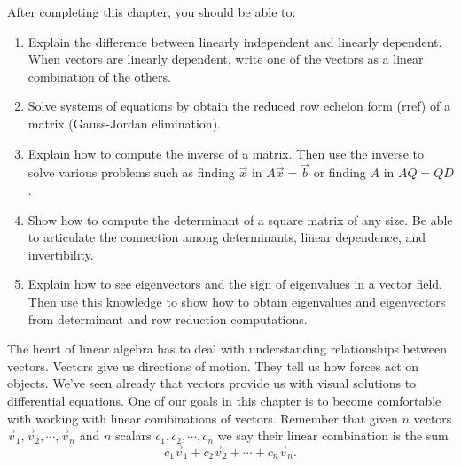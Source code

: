 \newcommand{\urlrref}{http://bmw.byuimath.com/dokuwiki/doku.php?id=rref\_calculator}



After completing this chapter, you should be able to:

\begin{enumerate}
\item Explain the difference between linearly independent and linearly dependent. When vectors are linearly dependent, write one of the vectors as a linear combination of the others. 
\item Solve systems of equations by obtain the reduced row echelon form (rref) of a matrix (Gauss-Jordan elimination).
\item Explain how to compute the inverse of a matrix. Then use the inverse to solve various problems such as finding $\vec x$ in $A\vec x = \vec b$ or finding $A$ in $AQ=QD$. 
\item Show how to compute the determinant of a square matrix of any size. Be able to articulate the connection among determinants, linear dependence, and invertibility. 
\item Explain how to see eigenvectors and the sign of eigenvalues in a vector field. Then use this knowledge to show how to obtain eigenvalues and eigenvectors from determinant and row reduction computations. 
\end{enumerate}


\newcommand{\ideagau}{Solving Systems of Equations}
\newcommand{\ideaind}{Linear Independence and Dependence}
\newcommand{\ideamul}{Matrix Multiplication and Inverses}
\newcommand{\ideadet}{Applications of Determinants}
\newcommand{\ideaeig}{Seeing Eigenvectors in Vector Fields}



\mysubsection{\ideaind}

The heart of linear algebra has to deal with understanding relationships between vectors.  Vectors give us directions of motion.  They tell us how forces act on objects. We've seen already that vectors provide us with visual solutions to differential equations. One of our goals in this chapter is to become comfortable with working with linear combinations of vectors.  
Remember that given $n$ vectors  $\vec v_1, \vec v_2,\cdots,\vec v_n$ and $n$ scalars $c_1, c_2, \cdots, c_n$ we say their linear combination is the sum $$c_1\vec v_1+c_2\vec v_2+\cdots+c_n\vec v_n.$$

